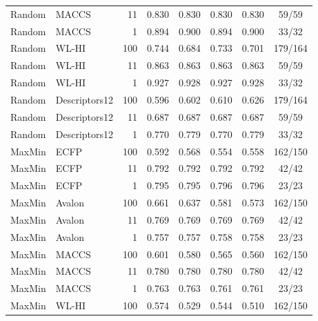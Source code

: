 \begin{longtable}{llrccccc}
Random & MACCS & 11 & 0.830 & 0.830 & 0.830 & 0.830 & 59/59 \\

Random & MACCS & 1 & 0.894 & 0.900 & 0.894 & 0.900 & 33/32 \\

Random & WL-HI & 100 & 0.744 & 0.684 & 0.733 & 0.701 & 179/164 \\

Random & WL-HI & 11 & 0.863 & 0.863 & 0.863 & 0.863 & 59/59 \\

Random & WL-HI & 1 & 0.927 & 0.928 & 0.927 & 0.928 & 33/32 \\

Random & Descriptors12 & 100 & 0.596 & 0.602 & 0.610 & 0.626 & 179/164 \\

Random & Descriptors12 & 11 & 0.687 & 0.687 & 0.687 & 0.687 & 59/59 \\

Random & Descriptors12 & 1 & 0.770 & 0.779 & 0.770 & 0.779 & 33/32 \\

MaxMin & ECFP & 100 & 0.592 & 0.568 & 0.554 & 0.558 & 162/150 \\

MaxMin & ECFP & 11 & 0.792 & 0.792 & 0.792 & 0.792 & 42/42 \\

MaxMin & ECFP & 1 & 0.795 & 0.795 & 0.796 & 0.796 & 23/23 \\

MaxMin & Avalon & 100 & 0.661 & 0.637 & 0.581 & 0.573 & 162/150 \\

MaxMin & Avalon & 11 & 0.769 & 0.769 & 0.769 & 0.769 & 42/42 \\

MaxMin & Avalon & 1 & 0.757 & 0.757 & 0.758 & 0.758 & 23/23 \\

MaxMin & MACCS & 100 & 0.601 & 0.580 & 0.565 & 0.560 & 162/150 \\

MaxMin & MACCS & 11 & 0.780 & 0.780 & 0.780 & 0.780 & 42/42 \\

MaxMin & MACCS & 1 & 0.763 & 0.763 & 0.761 & 0.761 & 23/23 \\

MaxMin & WL-HI & 100 & 0.574 & 0.529 & 0.544 & 0.510 & 162/150 \\


\end{longtable}
